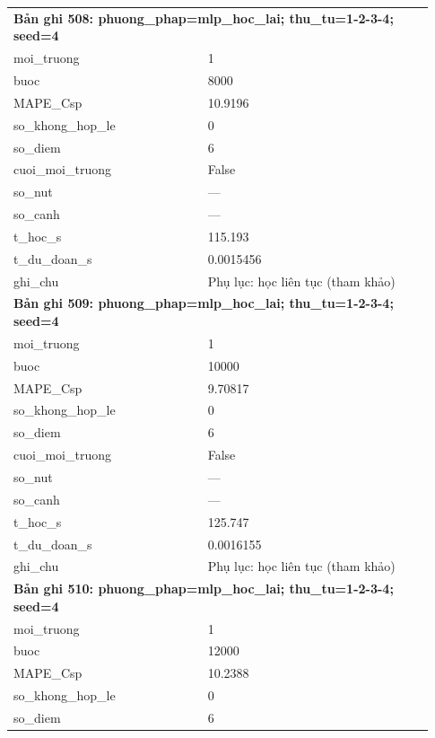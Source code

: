 \begin{longtable}{p{0.43\linewidth}p{0.50\linewidth}}
\midrule
\multicolumn{2}{p{0.95\linewidth}}{\textbf{Bản ghi 508: phuong\_phap=mlp\_hoc\_lai; thu\_tu=1-2-3-4; seed=4}} \\
moi\_\allowbreak truong & 1 \\
buoc & 8000 \\
MAPE\_\allowbreak Csp & 10.9196 \\
so\_\allowbreak khong\_\allowbreak hop\_\allowbreak le & 0 \\
so\_\allowbreak diem & 6 \\
cuoi\_\allowbreak moi\_\allowbreak truong & False \\
so\_\allowbreak nut & — \\
so\_\allowbreak canh & — \\
t\_\allowbreak hoc\_\allowbreak s & 115.193 \\
t\_\allowbreak du\_\allowbreak doan\_\allowbreak s & 0.0015456 \\
ghi\_\allowbreak chu & Phụ lục: học liên tục (tham khảo) \\
\midrule
\multicolumn{2}{p{0.95\linewidth}}{\textbf{Bản ghi 509: phuong\_phap=mlp\_hoc\_lai; thu\_tu=1-2-3-4; seed=4}} \\
moi\_\allowbreak truong & 1 \\
buoc & 10000 \\
MAPE\_\allowbreak Csp & 9.70817 \\
so\_\allowbreak khong\_\allowbreak hop\_\allowbreak le & 0 \\
so\_\allowbreak diem & 6 \\
cuoi\_\allowbreak moi\_\allowbreak truong & False \\
so\_\allowbreak nut & — \\
so\_\allowbreak canh & — \\
t\_\allowbreak hoc\_\allowbreak s & 125.747 \\
t\_\allowbreak du\_\allowbreak doan\_\allowbreak s & 0.0016155 \\
ghi\_\allowbreak chu & Phụ lục: học liên tục (tham khảo) \\
\midrule
\multicolumn{2}{p{0.95\linewidth}}{\textbf{Bản ghi 510: phuong\_phap=mlp\_hoc\_lai; thu\_tu=1-2-3-4; seed=4}} \\
moi\_\allowbreak truong & 1 \\
buoc & 12000 \\
MAPE\_\allowbreak Csp & 10.2388 \\
so\_\allowbreak khong\_\allowbreak hop\_\allowbreak le & 0 \\
so\_\allowbreak diem & 6 \\

\end{longtable}
